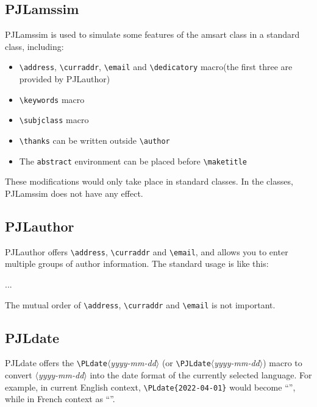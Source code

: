 \documentclass[allowbf,regionalref,puretext]{lebhart}
\providecommand{\meta}[1]{$\langle${\normalfont\itshape#1}$\rangle$}
\providecommand{\PJLamssim}{\textsf{PJLamssim}}
\providecommand{\PJLauthor}{\textsf{PJLauthor}}
\providecommand{\PJLdatePackage}{\textsf{PJLdate}}
\begin{document}
\subsection{PJLamssim}

\PJLamssim{} is used to simulate some features of the \textsf{amsart} class in a standard class, including:
\begin{itemize}
    \item \lstinline|\address|, \lstinline|\curraddr|, \lstinline|\email| and \lstinline|\dedicatory| macro(the first three are provided by \PJLauthor{})
    \item \lstinline|\keywords| macro
    \item \lstinline|\subjclass| macro
    \item \lstinline|\thanks| can be written outside \lstinline|\author|
    \item The \lstinline|abstract| environment can be placed before \lstinline|\maketitle|
\end{itemize}

These modifications would only take place in standard classes. In the \AmS{} classes, \PJLamssim{} does not have any effect.

\subsection{PJLauthor}

\PJLauthor{} offers \lstinline|\address|, \lstinline|\curraddr| and \lstinline|\email|, and allows you to enter multiple groups of author information. The standard usage is like this:
\begin{code}
  \author{(*\meta{author 1}*)}
  \address{(*\meta{address 1}*)}
  \email{(*\meta{email 1}*)}
  \author{(*\meta{author 2}*)}
  \address{(*\meta{address 2}*)}
  \email{(*\meta{email 2}*)}
  ...
\end{code}
The mutual order of \lstinline|\address|, \lstinline|\curraddr| and \lstinline|\email| is not important.

\subsection{PJLdate}

\PJLdatePackage{} offers the \lstinline|\PLdate|\meta{yyyy-mm-dd} (or \lstinline|\PJLdate|\meta{yyyy-mm-dd}) macro to convert \meta{yyyy-mm-dd} into the date format of the currently selected language. For example, in current English context, \lstinline|\PLdate{2022-04-01}| would become ``'', while in French context as ``''.
\end{document}
